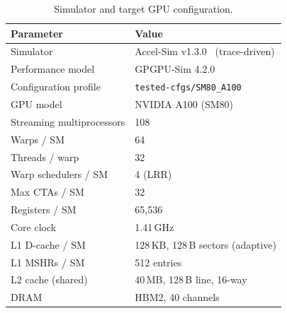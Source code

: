 \begin{table}[t]
  \caption{Simulator and target GPU configuration.}
  \label{tab:gpu-config}
  \centering
  \small
  \begin{tabular}{@{}ll@{}}
    \toprule
    \textbf{Parameter} & \textbf{Value} \\
    \midrule
    Simulator                  & Accel-Sim v1.3.0~\cite{khairy2020accelsim} (trace-driven) \\
    Performance model          & GPGPU-Sim 4.2.0 \\
    Configuration profile      & \texttt{tested-cfgs/SM80\_A100} \\
    \midrule
    GPU model                  & NVIDIA A100 (SM80) \\
    Streaming multiprocessors  & 108 \\
    Warps / SM                 & 64 \\
    Threads / warp             & 32 \\
    Warp schedulers / SM       & 4 (LRR) \\
    Max CTAs / SM              & 32 \\
    Registers / SM             & 65{,}536 \\
    Core clock                 & 1.41\,GHz \\
    \midrule
    L1 D-cache / SM            & 128\,KB, 128\,B sectors (adaptive) \\
    L1 MSHRs / SM              & 512 entries \\
    L2 cache (shared)          & 40\,MB, 128\,B line, 16-way \\
    DRAM                       & HBM2, 40 channels \\
    \bottomrule
  \end{tabular}
\end{table}



